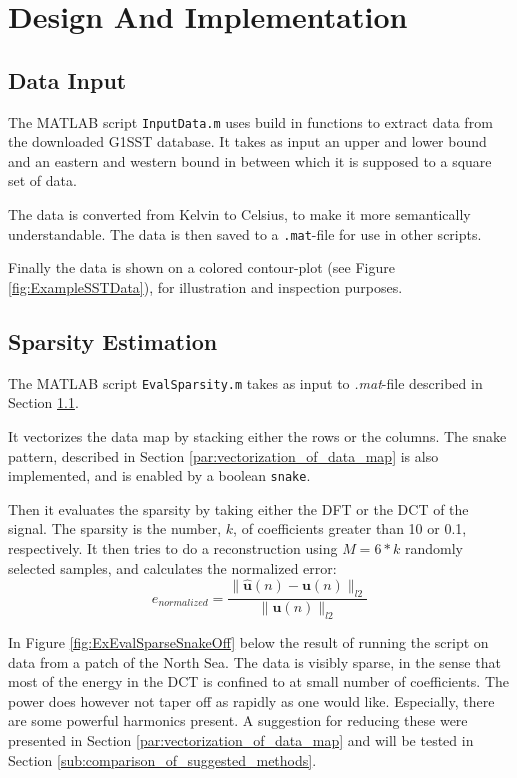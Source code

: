 \documentclass[Main]{subfiles}
\begin{document}
\section{Design And Implementation} %
\label{sec:design_and_implementation}

	\subsection{Data Input} %
	\label{sub:data_input}

		The MATLAB script \texttt{InputData.m} uses build in functions to extract data from the downloaded G1SST database.
		It takes as input an upper and lower bound and an eastern and western bound in between which it is supposed to a square set of data.

		The data is converted from Kelvin to Celsius, to make it more semantically understandable.
		The data is then saved to a \texttt{.mat}-file for use in other scripts.

		Finally the data is shown on a colored contour-plot (see Figure \ref{fig:ExampleSSTData}), for illustration and inspection purposes.

	

	\subsection{Sparsity Estimation} %
	\label{sub:sparsity_estimation}

		The MATLAB script \texttt{EvalSparsity.m} takes as input to \emph{.mat}-file described in Section \ref{sub:data_input}.

		It vectorizes the data map by stacking either the rows or the columns.
		The snake pattern, described in Section \ref{par:vectorization_of_data_map} is also implemented, and is enabled by a boolean \texttt{snake}.

		Then it evaluates the sparsity by taking either the DFT or the DCT of the signal.
		The sparsity is the number, $k$, of coefficients greater than 10 or 0.1, respectively.
		It then tries to do a reconstruction using $M = 6*k$ randomly selected samples, and calculates the normalized error:
		\begin{equation}
			e_{normalized} = \frac
				{\|\mathbf{\hat{u}}(n) - \mathbf{u}(n)\|_{l2}}
				{\|\mathbf{u}(n)\|_{l2}}
		\end{equation}

		In Figure \ref{fig:ExEvalSparseSnakeOff} below the result of running the script on data from a patch of the North Sea.
		The data is visibly sparse, in the sense that most of the energy in the DCT is confined to at small number of coefficients.
		The power does however not taper off as rapidly as one would like.
		Especially, there are some powerful harmonics present.
		A suggestion for reducing these were presented in Section \ref{par:vectorization_of_data_map} and will be tested in Section \ref{sub:comparison_of_suggested_methods}.
\end{document}
